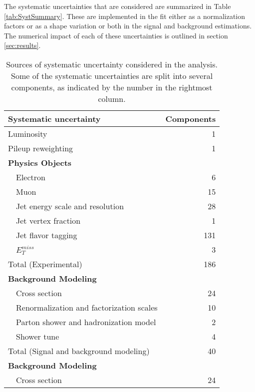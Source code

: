 The systematic uncertainties that are considered are summarized in Table \ref{tab:SystSummary}. These are implemented in the fit either as a normalization factors or as a shape variation or both in the signal and background estimations. The numerical impact of each of these uncertainties is outlined in section \ref{sec:results}.

\begin{table}[H]
\centering
\caption{Sources of systematic uncertainty considered in the analysis. Some of the systematic uncertainties are split into several components, as indicated by the number in the rightmost column.}
\begin{tabular}{lr}
\hline\hline
Systematic uncertainty & Components           \\
\hline
\hline
Luminosity      & 1                   \\
Pileup reweighting      & 1                   \\
\textbf {Physics Objects}       &                     \\
\ \ Electron                                    & 6                   \\
\ \ Muon        & 15                  \\
\ \ Jet energy scale and resolution     & 28                  \\
\ \ Jet vertex fraction         & 1                   \\
\ \ Jet flavor tagging          & 131                 \\
\ \ $E^{miss}_T$        & 3                   \\
\hline
Total (Experimental)        & 186                    \\
\hline
\hline
\textbf {Background Modeling}           &                     \\
\ \ Cross section                       & 24                  \\
\ \ Renormalization and factorization scales    & 10                  \\
\ \ Parton shower and hadronization model               & 2                   \\
\ \ Shower tune                         & 4                   \\
\hline
Total (Signal and background modeling)       & 40                    \\
\hline
\hline
\textbf {Background Modeling}           &                     \\
\ \ Cross section                       & 24                  \\

\end{tabular}
\end{table}
